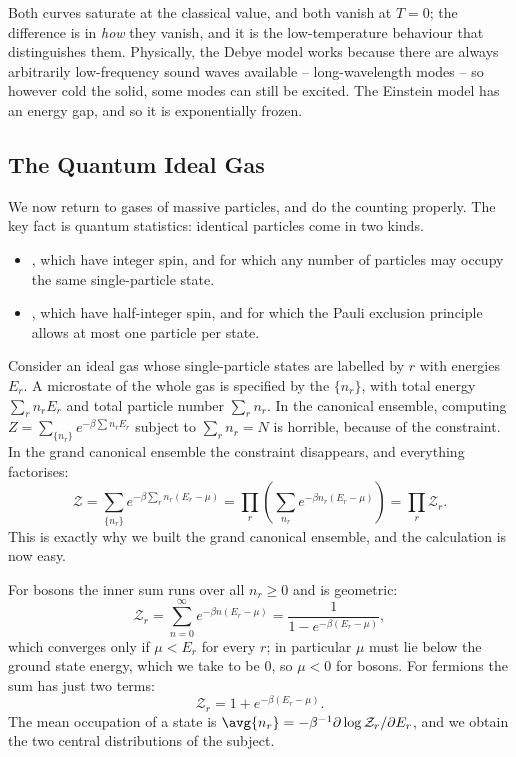 Both curves saturate at the classical value, and both vanish at $T=0$; the difference is in \emph{how} they vanish, and it is the low-temperature behaviour that distinguishes them. Physically, the Debye model works because there are always arbitrarily low-frequency sound waves available -- long-wavelength modes -- so however cold the solid, some modes can still be excited. The Einstein model has an energy gap, and so it is exponentially frozen.

\subsection{The Quantum Ideal Gas}

We now return to gases of massive particles, and do the counting properly. The key fact is quantum statistics: identical particles come in two kinds.

\begin{itemize}
	\item {}, which have integer spin, and for which any number of particles may occupy the same single-particle state.
	\item {}, which have half-integer spin, and for which the Pauli exclusion principle allows at most one particle per state.
\end{itemize}

Consider an ideal gas whose single-particle states are labelled by $r$ with energies $E_r$. A microstate of the whole gas is specified by the  $\{n_r\}$, with total energy $\sum_r n_r E_r$ and total particle number $\sum_r n_r$. In the canonical ensemble, computing $Z = \sum_{\{n_r\}} e^{-\beta\sum n_r E_r}$ subject to $\sum_r n_r = N$ is horrible, because of the constraint. In the grand canonical ensemble the constraint disappears, and everything factorises:
$$
\mathcal Z = \sum_{\{n_r\}}e^{-\beta\sum_r n_r(E_r - \mu)} = \prod_r \left(\sum_{n_r} e^{-\beta n_r (E_r-\mu)}\right) = \prod_r \mathcal Z_r.
$$
This is exactly why we built the grand canonical ensemble, and the calculation is now easy.

For bosons the inner sum runs over all $n_r \ge 0$ and is geometric:
$$
\mathcal Z_r = \sum_{n=0}^\infty e^{-\beta n(E_r - \mu)} = \frac{1}{1 - e^{-\beta(E_r-\mu)}},
$$
which converges only if $\mu < E_r$ for every $r$; in particular $\mu$ must lie below the ground state energy, which we take to be $0$, so $\mu < 0$ for bosons. For fermions the sum has just two terms:
$$
\mathcal Z_r = 1 + e^{-\beta(E_r-\mu)}.
$$
The mean occupation of a state is $\avg{n_r} = -\beta^{-1}\partial \log\mathcal Z_r/\partial E_r$, and we obtain the two central distributions of the subject.

